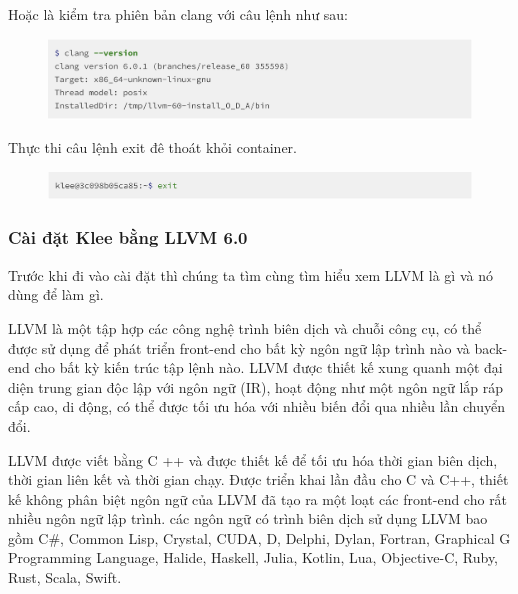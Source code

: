 \documentclass[12pt,a4paper]{article}
\begin{document}
\begin{itemize}
\newpage Hoặc là kiểm tra phiên bản clang với câu lệnh như sau:

\begin{figure}[ht]
\begin{center}
\includegraphics[scale=0.3]{hinhanh/clangversion.png}
\end{center}
\end{figure}

Thực thi câu lệnh exit đê thoát khỏi container.

\begin{figure}[ht]
\begin{center}
\includegraphics[scale=.3]{hinhanh/exitcontainer.png}
\end{center}
\end{figure}
\end{itemize}

\subsubsection{Cài đặt Klee bằng LLVM 6.0}

Trước khi đi vào cài đặt thì chúng ta tìm cùng tìm hiểu xem LLVM là gì và nó dùng để làm gì.

LLVM là một tập hợp các công nghệ trình biên dịch và chuỗi công cụ, có thể được sử dụng để phát triển front-end cho bất kỳ ngôn ngữ lập trình nào và back-end cho bất kỳ kiến trúc tập lệnh nào. LLVM được thiết kế xung quanh một đại diện trung gian độc lập với ngôn ngữ (IR), hoạt động như một ngôn ngữ lắp ráp cấp cao, di động, có thể được tối ưu hóa với nhiều biến đổi qua nhiều lần chuyển đổi.

LLVM được viết bằng C ++ và được thiết kế để tối ưu hóa thời gian biên dịch, thời gian liên kết và thời gian chạy. Được triển khai lần đầu cho C và C++, thiết kế không phân biệt ngôn ngữ của LLVM đã tạo ra một loạt các front-end cho rất nhiều ngôn ngữ lập trình. các ngôn ngữ có trình biên dịch sử dụng LLVM bao gồm C\#, Common Lisp, Crystal, CUDA, D, Delphi, Dylan, Fortran, Graphical G Programming Language, Halide, Haskell, Julia, Kotlin, Lua, Objective-C, Ruby, Rust, Scala, Swift.
\end{document}
